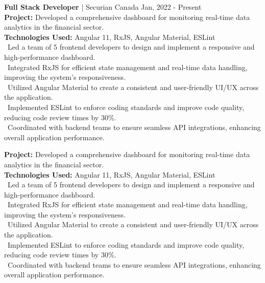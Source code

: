 {\textbf{Full Stack Developer } | Securian Canada \hfill {Jan, 2022 - Present} \\[4pt]
\hspace*{0pt}\textbf{Project:} Developed a comprehensive dashboard for monitoring real-time data analytics in the financial sector. \\
\hspace*{0pt}\textbf{Technologies Used:} Angular 11, RxJS, Angular Material, ESLint \\
\hspace*{4pt}\textbullet\content~Led a team of 5 frontend developers to design and implement a responsive and high-performance dashboard. \\
\hspace*{4pt}\textbullet\content~Integrated RxJS for efficient state management and real-time data handling, improving the system's responsiveness. \\
\hspace*{4pt}\textbullet\content~Utilized Angular Material to create a consistent and user-friendly UI/UX across the application. \\
\hspace*{4pt}\textbullet\content~Implemented ESLint to enforce coding standards and improve code quality, reducing code review times by 30\%. \\
\hspace*{4pt}\textbullet\content~Coordinated with backend teams to ensure seamless API integrations, enhancing overall application performance.\\[2pt]}

\hspace*{0pt}\textbf{Project:} Developed a comprehensive dashboard for monitoring real-time data analytics in the financial sector. \\
\hspace*{0pt}\textbf{Technologies Used:} Angular 11, RxJS, Angular Material, ESLint \\
\hspace*{4pt}\textbullet\content~Led a team of 5 frontend developers to design and implement a responsive and high-performance dashboard. \\
\hspace*{4pt}\textbullet\content~Integrated RxJS for efficient state management and real-time data handling, improving the system's responsiveness. \\
\hspace*{4pt}\textbullet\content~Utilized Angular Material to create a consistent and user-friendly UI/UX across the application. \\
\hspace*{4pt}\textbullet\content~Implemented ESLint to enforce coding standards and improve code quality, reducing code review times by 30\%. \\
\hspace*{4pt}\textbullet\content~Coordinated with backend teams to ensure seamless API integrations, enhancing overall application performance. \\[4pt]

